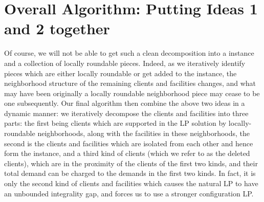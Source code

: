 \section{Overall Algorithm: Putting Ideas 1 and 2 together}
Of course, we will not be able to get such a clean decomposition into a \cckp instance and a collection of locally roundable pieces. Indeed, as we iteratively identify pieces which are either locally roundable or get added to the \cckp instance, the neighborhood structure of the remaining clients and facilities changes, and what may have been originally a locally roundable neighborhood piece may cease to be one subsequently. Our final algorithm then combine the above two ideas in a dynamic manner: we iteratively decompose the clients and facilities into three parts: the first being clients which are supported in the LP solution by locally-roundable neighborhoods, along with the facilities in these neighborhoods, the second is the clients and facilities which are isolated from each other and hence form the \cckp instance, and a third kind of clients (which we refer to as the deleted clients), which are in the proximity of the clients of the first two kinds, and their total demand can be charged to the demands in the first two kinds.
In fact, it is only the second kind of clients and facilities which causes the natural LP to have an unbounded integrality gap, and forces us to use a stronger configuration LP.


